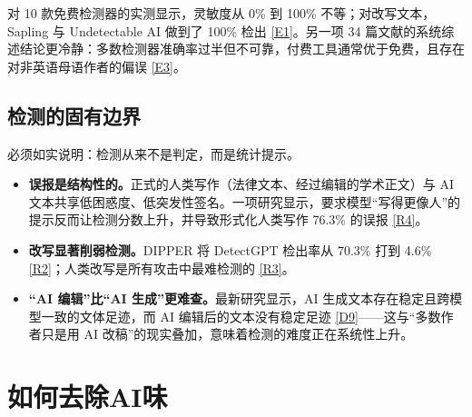 \documentclass[10pt,a4paper]{ctexart}
\begin{document}
\begin{justifying}
对 10 款免费检测器的实测显示，灵敏度从 0\% 到 100\% 不等；对改写文本，Sapling 与 Undetectable AI 做到了 100\% 检出 \href{https://pmc.ncbi.nlm.nih.gov/articles/PMC11572508/}{[E1]}。另一项 34 篇文献的系统综述结论更冷静：多数检测器准确率过半但不可靠，付费工具通常优于免费，且存在对非英语母语作者的偏误 \href{https://pdfs.semanticscholar.org/4dc4/448b5b6225ab3e63bcb7f5cf88ed83fcc050.pdf}{[E3]}。

\subsection{检测的固有边界}

必须如实说明：检测从来不是判定，而是统计提示。

\begin{itemize}[leftmargin=2em,itemsep=1pt]
\item \textbf{误报是结构性的。}正式的人类写作（法律文本、经过编辑的学术正文）与 AI 文本共享低困惑度、低突发性签名。一项研究显示，要求模型“写得更像人”的提示反而让检测分数上升，并导致形式化人类写作 76.3\% 的误报 \href{https://arxiv.org/abs/2610.03110}{[R4]}。
\item \textbf{改写显著削弱检测。}DIPPER 将 DetectGPT 检出率从 70.3\% 打到 4.6\% \href{https://arxiv.org/abs/2303.13408}{[R2]}；人类改写是所有攻击中最难检测的 \href{https://arxiv.org/abs/2412.05139}{[R3]}。
\item \textbf{“AI 编辑”比“AI 生成”更难查。}最新研究显示，AI 生成文本存在稳定且跨模型一致的文体足迹，而 AI 编辑后的文本没有稳定足迹 \href{https://arxiv.org/abs/2608.27855}{[D9]}——这与“多数作者只是用 AI 改稿”的现实叠加，意味着检测的难度正在系统性上升。
\end{itemize}

\end{justifying}

\section{如何去除AI味}
\end{document}
